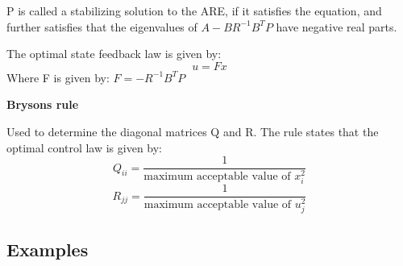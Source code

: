 P is called a stabilizing solution to the ARE, if it satisfies the equation, and further satisfies that the eigenvalues of
$A-BR^{-1}B^TP$ have negative real parts.

The optimal state feedback law is given by:
$$u = Fx$$
Where F is given by:
$F = -R^{-1}B^TP$


\textbf{Brysons rule}

Used to determine the diagonal matrices Q and R. The rule states that the optimal control law is given by:
$$ Q_{ii} = \frac{1}{\text{maximum acceptable value of } x_i^2} $$
$$ R_{jj} = \frac{1}{\text{maximum acceptable value of } u_j^2} $$

\subsection{Examples}
